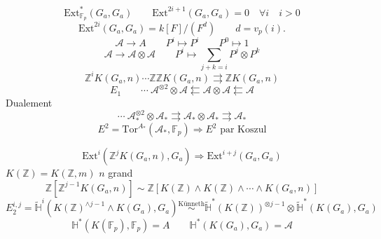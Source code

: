 \documentclass[11pt,a4paper]{article}
\begin{document}
\[
  \mathrm{Ext}^{\ast}_{\mathbb{F}_p}(G_a,G_a) \qquad
  \mathrm{Ext}^{2i+1}(G_a,G_a) = 0 \quad \forall i \quad i>0
\]
\[
  \mathrm{Ext}^{2i}(G_a,G_a) = k[F]/(F^d) \qquad d = v_p(i).
\]
\[
  \mathcal{A} \to A \qquad P^i \mapsto P^i \qquad P^0 \mapsto 1
\]
\[
  \mathcal{A} \to \mathcal{A}\otimes\mathcal{A} \qquad P^i \mapsto \sum_{j+k=i} P^j\otimes P^k
\]
\[
  \mathbb{Z}^iK(G_a,n) \cdots \mathbb{Z}\mathbb{Z}K(G_a,n) \rightrightarrows \mathbb{Z}K(G_a,n)
\]
\[
  E_1 \qquad \cdots\ \mathcal{A}^{\otimes 2}\otimes\mathcal{A} \leftleftarrows \mathcal{A}\otimes\mathcal{A} \leftleftarrows \mathcal{A}
\]
Dualement
\[
  \cdots\ \mathcal{A}_{\ast}^{\otimes 2}\otimes\mathcal{A}_{\ast} \rightrightarrows \mathcal{A}_{\ast}\otimes\mathcal{A}_{\ast} \rightrightarrows \mathcal{A}_{\ast}
\]
\[
  E^2 = \mathrm{Tor}^{A_{\ast}}(\mathcal{A}_{\ast},\mathbb{F}_p) \Longrightarrow E^2 \text{ par Koszul}
\]

\[
  \mathrm{Ext}^i(\mathbb{Z}^jK(G_a,n),G_a) \Longrightarrow \mathrm{Ext}^{i+j}(G_a,G_a)
\]
$K(\mathbb{Z}) = K(\mathbb{Z},m)$ \quad $n$ grand
\[
  \mathbb{Z}[\mathbb{Z}^{j-1}K(G_a,n)] \sim \mathbb{Z}[K(\mathbb{Z})\wedge K(\mathbb{Z})\wedge\cdots\wedge K(G_a,n)]
\]
\[
  E_2^{i,j} = \widetilde{\mathbb{H}}^{i}(K(\mathbb{Z})^{\wedge j-1}\wedge K(G_a),G_a)
  \overset{\text{Künneth}}{\sim}
  \widetilde{\mathbb{H}}^{\ast}(K(\mathbb{Z}))^{\otimes j-1}\otimes\widetilde{\mathbb{H}}^{\ast}(K(G_a),G_a)
\]
\[
  \mathbb{H}^{\ast}(K(\mathbb{F}_p),\mathbb{F}_p) = A \qquad
  \mathbb{H}^{\ast}(K(G_a),G_a) = \mathcal{A}
\]
\end{document}
